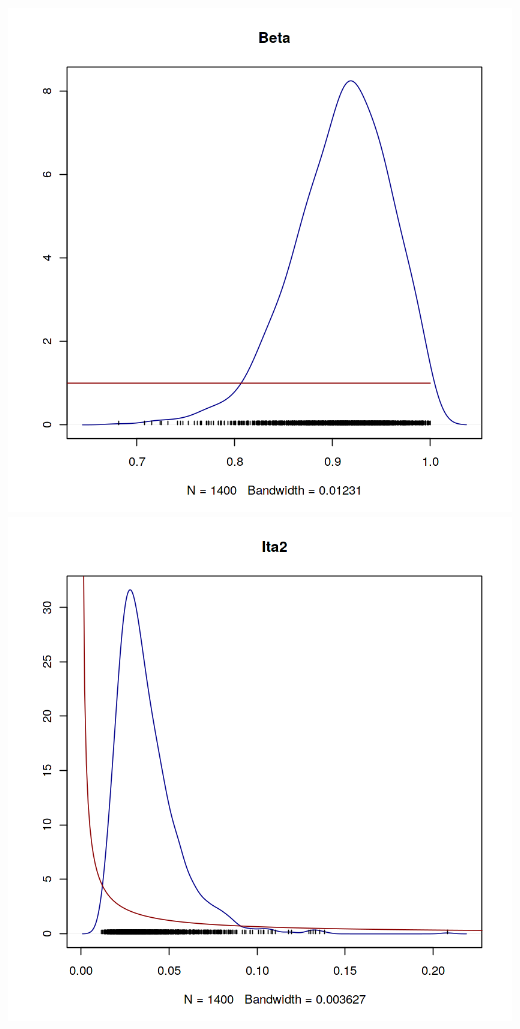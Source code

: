 \documentclass[12pt,a4paper]{article}
\begin{document}
\begin{enumerate}[(a)]
\includegraphics[scale=0.25]{./images/1_Figure3_beta_posterior.png}
\includegraphics[scale=0.25]{./images/1_Figure3_ita_posterior.png}



\end{enumerate}
\end{document}

